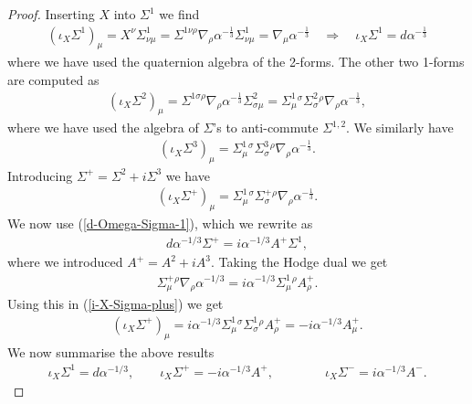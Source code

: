 \documentclass[10pt,a4paper]{amsart}
\begin{document}
\begin{proof}
    Inserting $X$ into $\Sigma^1$ we find
    \begin{align}
        (\iota_X \Sigma^1)_\mu = X^\nu \Sigma^1_{\nu \mu} = \Sigma^{1 \nu \rho} \nabla_\rho \alpha^{-\frac{1}{3}} \Sigma^1_{\nu \mu} = \nabla_\mu \alpha^{-\frac{1}{3}} \quad \Rightarrow \quad \iota_X \Sigma^1 = d\alpha^{-\frac{1}{3}}
    \end{align}
    where we have used the quaternion algebra of the 2-forms. The other two 1-forms are computed as
    \begin{align}
    (\iota_X \Sigma^2)_\mu = \Sigma^{1\sigma\rho} \nabla_\rho \alpha^{-\frac{1}{3}} \Sigma^2_{\sigma\mu}= \Sigma^1_\mu{}^\sigma \Sigma^2_\sigma{}^\rho \nabla_\rho \alpha^{-\frac{1}{3}},
      \end{align}
      where we have used the algebra of $\Sigma$'s to anti-commute $\Sigma^{1,2}$. We similarly have
     \begin{align}
     (\iota_X \Sigma^3)_\mu = \Sigma^1_\mu{}^\sigma \Sigma^3_\sigma{}^\rho \nabla_\rho \alpha^{-\frac{1}{3}}.
     \end{align}
     Introducing $\Sigma^+ = \Sigma^2+ i \Sigma^3$ we have
      \begin{align}\label{i-X-Sigma-plus}
      (\iota_X \Sigma^+)_\mu = \Sigma^1_\mu{}^\sigma \Sigma^+_\sigma{}^\rho \nabla_\rho \alpha^{-\frac{1}{3}}.
      \end{align}
      We now use (\ref{d-Omega-Sigma-1}), which we rewrite as 
      \begin{align}
      d\alpha^{-1/3} \Sigma^+ = i \alpha^{-1/3} A^+ \Sigma^1,
      \end{align}
      where we introduced $A^+=A^2+ iA^3$. Taking the Hodge dual we get
       \begin{align}
      \Sigma^+_\mu{}^\rho \nabla_\rho \alpha^{-1/3}  = i \alpha^{-1/3} \Sigma^1_\mu{}^\rho A^+_\rho.
      \end{align}
      Using this in (\ref{i-X-Sigma-plus}) we get
       \begin{align}
      (\iota_X \Sigma^+)_\mu =  i \alpha^{-1/3} \Sigma^1_\mu{}^\sigma  \Sigma^1_\sigma{}^\rho A^+_\rho = -i \alpha^{-1/3}A^+_\mu.
      \end{align}
      We now summarise the above results
      \begin{align}\label{i-X-Sigma-plus*}
      \iota_X \Sigma^1 = d \alpha^{-1/3}, \qquad \iota_X \Sigma^+= -i \alpha^{-1/3}A^+, \qquad  \qquad \iota_X \Sigma^-= i \alpha^{-1/3}A^-.
 \end{align}
 

\end{proof}
\end{document}
